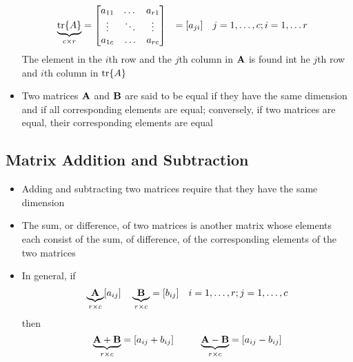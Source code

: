 \begin{itemize}
$$\begin{aligned}
\underbrace{\tr{A}}_{c \times r} &= \begin{bmatrix} a_{11} & \dots & a_{r1} \\ \vdots & \ddots & \vdots \\ a_{1c} & \hdots & a_{rc}  \end{bmatrix} &= [a_{ji}] ~~~ &j = 1,\dots, c; i = 1, \dots r \end{aligned} $$ 
The element in the $i$th row and the $j$th column in $\mathbf{A}$ is found int he $j$th row and $i$th column in $\tr{A}$
\item Two matrices $\mathbf{A}$ and $\mathbf{B}$ are said to be equal if they have the same dimension and if all corresponding elements are equal; conversely, if two matrices are equal, their corresponding elements are equal
\end{itemize}

\subsection{Matrix Addition and Subtraction}
\begin{itemize}
\item Adding and subtracting two matrices require that they have the same dimension
\item The sum, or difference, of two matrices is another matrix  whose elements each consist of the sum, of difference, of the corresponding elements of the two matrices 
\item In general, if $$ \underbrace{\mathbf{A}}_{r \times c} [ a_{ij}] ~~~ \underbrace{\mathbf{B}}_{r \times c} = [b_{ij}] ~~~ i = 1,\dots,r; j = 1,\dots, c $$ 
then $$ \underbrace{\mathbf{A} + \mathbf{B}}_{r \times c} = [a_{ij} + b_{ij}] ~~~~~~~~ \underbrace{\mathbf{A} - \mathbf{B}}_{r \times c} = [a_{ij} - b_{ij}] $$ 
\end{itemize}

